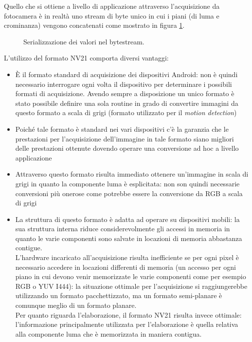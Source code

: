 \noindent Quello che si ottiene a livello di applicazione attraverso l'acquisizione da fotocamera è in realtà uno stream di byte unico in cui i piani (di luma e crominanza) vengono concatenati come mostrato in figura \ref{YUVbytestream}.
\begin{figure}[!ht]
\begin{center}
\makebox[\linewidth]{\YUVbytestream}
\end{center}
\caption{Serializzazione dei valori nel bytestream.}
\label{YUVbytestream}
\end{figure}


L'utilizzo del formato NV21 comporta diversi vantaggi:
\begin{itemize}
  \item \`E il formato standard di acquisizione dei dispositivi Android: non è quindi necessario interrogare ogni volta il dispositivo per determinare i possibili formati di acquisizione. Avendo sempre a disposizione un unico formato è stato possibile definire una sola routine in grado di convertire immagini da questo formato a scala di grigi (formato utilizzato per il \textit{motion detection})
  \item Poiché tale formato è standard nei vari dispositivi c'è la garanzia che le prestazioni per l'acquisizione dell'immagine in tale formato siano migliori delle prestazioni ottenute dovendo operare una conversione ad hoc a livello applicazione
  \item Attraverso questo formato risulta immediato ottenere un'immagine in scala di grigi in quanto la componente luma è esplicitata: non son quindi necessarie conversioni più onerose come potrebbe essere la conversione da RGB a scala di grigi
  \item La struttura di questo formato è adatta ad operare su dispositivi mobili: la sua struttura interna riduce considerevolmente gli accessi in memoria in quanto le varie componenti sono salvate in locazioni di memoria abbastanza contigue.\\
  L'hardware incaricato all'acquisizione risulta inefficiente se per ogni pixel è necessario accedere in locazioni differenti di memoria (un accesso per ogni piano in cui devono venir memorizzate le varie componenti come per esempio RGB o YUV I444): la situazione ottimale per l'acquisizione si raggiungerebbe utilizzando un formato pacchettizzato, ma un formato semi-planare è comunque meglio di un formato planare.\\
  Per quanto riguarda l'elaborazione, il formato NV21 risulta invece ottimale: l'informazione principalmente utilizzata per l'elaborazione è quella relativa alla componente luma che è memorizzata in maniera contigua.
\end{itemize}

